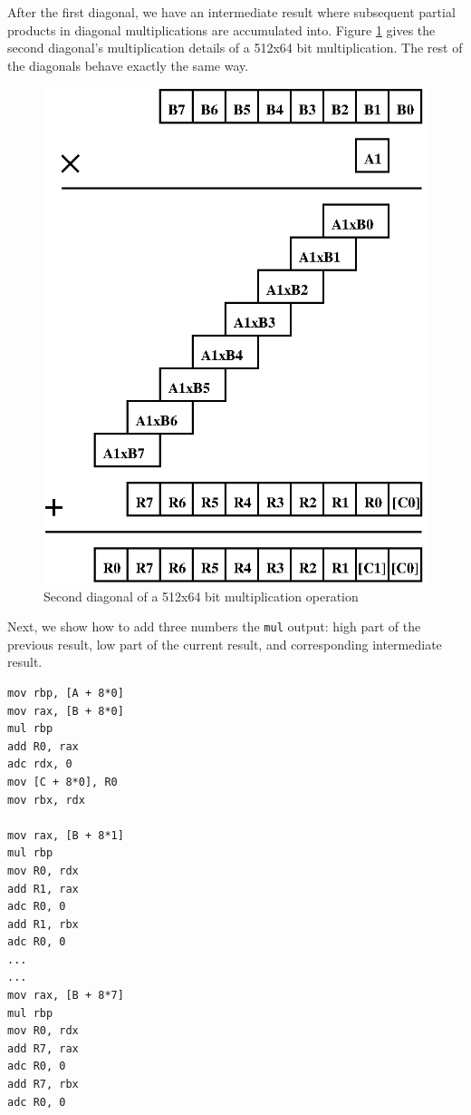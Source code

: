 \documentclass[twocolumn]{svjour3}          %
\begin{document}
After the first diagonal, we have an intermediate result where subsequent partial products in diagonal multiplications are accumulated into. Figure \ref{fig:diag1} gives the second diagonal's multiplication details of a 512x64 bit multiplication. The rest of the diagonals behave exactly the same way.

\begin{figure}[ht]
\centering
  \includegraphics[scale=0.7]{multdiag1.eps}
\caption{Second diagonal of a 512x64 bit multiplication operation}
\label{fig:diag1}
\end{figure}

Next, we show how to add three numbers the \texttt{mul} output: 
high part of the previous result, low part of the current result, and corresponding intermediate result.

\begin{verbatim}
mov rbp, [A + 8*0]
mov rax, [B + 8*0]
mul rbp	
add	R0, rax
adc rdx, 0
mov [C + 8*0], R0
mov rbx, rdx

mov rax, [B + 8*1]
mul rbp
mov R0, rdx
add R1, rax
adc R0, 0
add R1, rbx
adc R0, 0
...
...
mov rax, [B + 8*7]
mul rbp
mov R0, rdx
add R7, rax
adc R0, 0
add R7, rbx
adc R0, 0
\end{verbatim}
\end{document}
